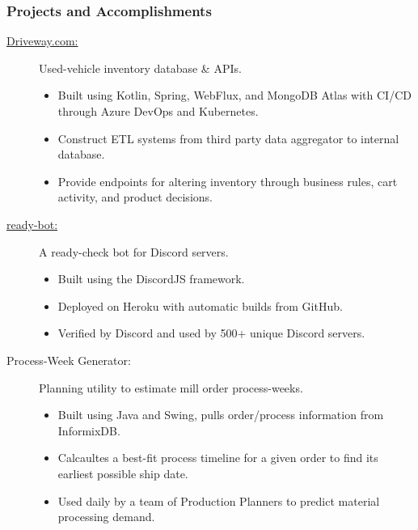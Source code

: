 \documentclass{article}
\begin{document}
\subsubsection*{Projects and Accomplishments}
    \begin{description}

        \item[\href{https://driveway.com/shop}{Driveway.com:\hspace{0.075in}}] Used-vehicle inventory database \& APIs.
            \begin{itemize}
                \item Built using Kotlin, Spring, WebFlux, and MongoDB Atlas with CI/CD through Azure DevOps and Kubernetes.
                \item Construct ETL systems from third party data aggregator to internal database.
                \item Provide endpoints for altering inventory through business rules, cart activity, and product decisions.
            \end{itemize}

            \vspace{0.5em}
        \item[\href{https://www.github.com/BurnsCommaLucas/ready-bot}{ready-bot:\hspace{0.075in}}] A ready-check bot for Discord servers.
            \begin{itemize}
                \item Built using the DiscordJS framework.
                \item Deployed on Heroku with automatic builds from GitHub.
                \item Verified by Discord and used by 500+ unique Discord servers.
            \end{itemize}

            \vspace{0.5em}

        \item[Process-Week Generator:] Planning utility to estimate mill order process-weeks.
            \begin{itemize}
                \item Built using Java and Swing, pulls order/process information from InformixDB.
                \item Calcaultes a best-fit process timeline for a given order to find its earliest possible ship date.
                \item Used daily by a team of Production Planners to predict material processing demand.
            \end{itemize}


\end{description}
\end{document}

